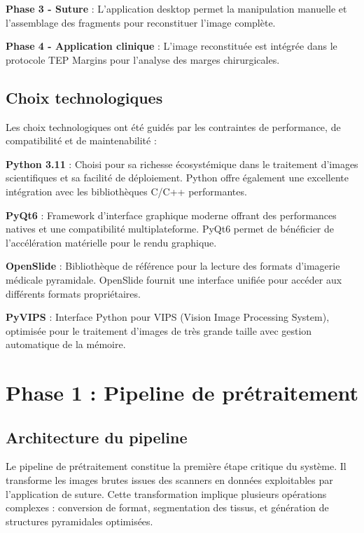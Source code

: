 \documentclass[12pt,a4paper]{report}
\begin{document}
\textbf{Phase 3 - Suture} : L'application desktop permet la manipulation manuelle et l'assemblage des fragments pour reconstituer l'image complète.

\textbf{Phase 4 - Application clinique} : L'image reconstituée est intégrée dans le protocole TEP Margins pour l'analyse des marges chirurgicales.

\subsection{Choix technologiques}

Les choix technologiques ont été guidés par les contraintes de performance, de compatibilité et de maintenabilité :

\textbf{Python 3.11} : Choisi pour sa richesse écosystémique dans le traitement d'images scientifiques et sa facilité de déploiement. Python offre également une excellente intégration avec les bibliothèques C/C++ performantes.

\textbf{PyQt6} : Framework d'interface graphique moderne offrant des performances natives et une compatibilité multiplateforme. PyQt6 permet de bénéficier de l'accélération matérielle pour le rendu graphique.

\textbf{OpenSlide} : Bibliothèque de référence pour la lecture des formats d'imagerie médicale pyramidale. OpenSlide fournit une interface unifiée pour accéder aux différents formats propriétaires.

\textbf{PyVIPS} : Interface Python pour VIPS (Vision Image Processing System), optimisée pour le traitement d'images de très grande taille avec gestion automatique de la mémoire.

\section{Phase 1 : Pipeline de prétraitement}

\subsection{Architecture du pipeline}

Le pipeline de prétraitement constitue la première étape critique du système. Il transforme les images brutes issues des scanners en données exploitables par l'application de suture. Cette transformation implique plusieurs opérations complexes : conversion de format, segmentation des tissus, et génération de structures pyramidales optimisées.
\end{document}
